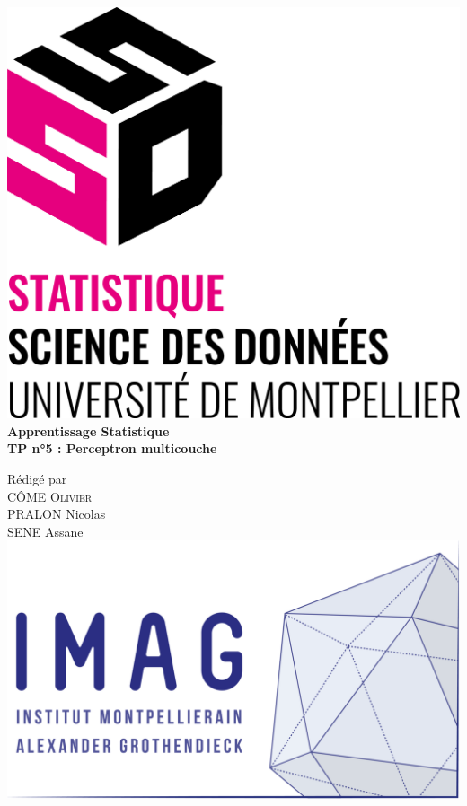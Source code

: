 \documentclass[frenchb]{report}
\newcommand{\1}{\mathbbm{1}}
\theoremstyle{definition}\newtheorem{defn}{Définition}
\theoremstyle{definition}\newtheorem{exm}{Exemple}
\theoremstyle{definition}\newtheorem{nota}{Notation}
\theoremstyle{definition}\newtheorem{rem}{Remarque}
\begin{document}
\begin{titlepage}
\begin{center}
\includegraphics[scale=0.30]{images/ssd.png}\\[3cm]
\linespread{1.2}\huge {\bfseries Apprentissage Statistique }\\[0.5cm]
\linespread{1.2}\LARGE {\bfseries TP n°5 : Perceptron multicouche}\\[1.5cm]
\linespread{1}

{\large Rédigé par\\}
{\Large \textsc{CÔME Olivier} }\\
{\Large \textsc{PRALON} Nicolas}\\
{\Large \textsc{SENE} Assane}\\[1cm]

\includegraphics[scale=0.7]{images/imag_logo.png}

\end{center}
\end{titlepage}
\tableofcontents
\newpage
\end{document}
